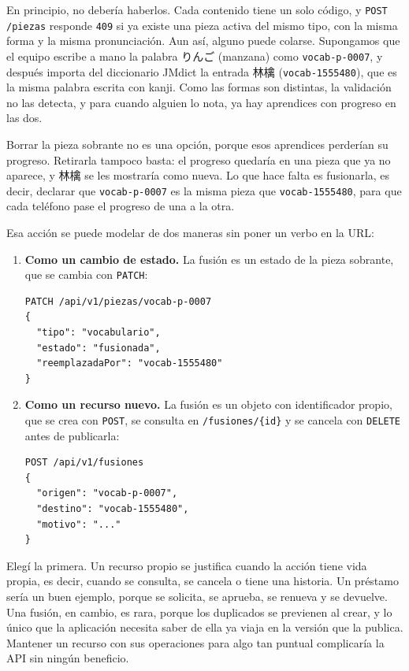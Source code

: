 \documentclass[11pt]{article}
\begin{document}
En principio, no debería haberlos. Cada contenido tiene un solo código, y \texttt{POST /piezas} responde \texttt{409} si ya existe una pieza activa del mismo tipo, con la misma forma y la misma pronunciación. Aun así, alguno puede colarse. Supongamos que el equipo escribe a mano la palabra りんご (manzana) como \texttt{vocab-p-0007}, y después importa del diccionario JMdict la entrada 林檎 (\texttt{vocab-1555480}), que es la misma palabra escrita con kanji. Como las formas son distintas, la validación no las detecta, y para cuando alguien lo nota, ya hay aprendices con progreso en las dos.

Borrar la pieza sobrante no es una opción, porque esos aprendices perderían su progreso. Retirarla tampoco basta: el progreso quedaría en una pieza que ya no aparece, y 林檎 se les mostraría como nueva. Lo que hace falta es fusionarla, es decir, declarar que \texttt{vocab-p-0007} es la misma pieza que \texttt{vocab-1555480}, para que cada teléfono pase el progreso de una a la otra.

Esa acción se puede modelar de dos maneras sin poner un verbo en la URL:

\begin{enumerate}
  \item \textbf{Como un cambio de estado.} La fusión es un estado de la pieza sobrante, que se cambia con \texttt{PATCH}:
\begin{lstlisting}
PATCH /api/v1/piezas/vocab-p-0007
{
  "tipo": "vocabulario",
  "estado": "fusionada",
  "reemplazadaPor": "vocab-1555480"
}
\end{lstlisting}
  \item \textbf{Como un recurso nuevo.} La fusión es un objeto con identificador propio, que se crea con \texttt{POST}, se consulta en \texttt{/fusiones/\{id\}} y se cancela con \texttt{DELETE} antes de publicarla:
\begin{lstlisting}
POST /api/v1/fusiones
{
  "origen": "vocab-p-0007",
  "destino": "vocab-1555480",
  "motivo": "..."
}
\end{lstlisting}
\end{enumerate}

Elegí la primera. Un recurso propio se justifica cuando la acción tiene vida propia, es decir, cuando se consulta, se cancela o tiene una historia. Un préstamo sería un buen ejemplo, porque se solicita, se aprueba, se renueva y se devuelve. Una fusión, en cambio, es rara, porque los duplicados se previenen al crear, y lo único que la aplicación necesita saber de ella ya viaja en la versión que la publica. Mantener un recurso con sus operaciones para algo tan puntual complicaría la API sin ningún beneficio.
\end{document}
